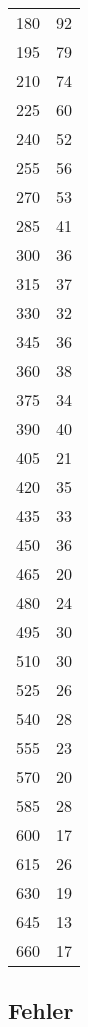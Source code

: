 \begin{table}
\begin{minipage}{.5\linewidth}
\begin{tabular}{c c}
            180	 &  92 \\
            195	 &  79 \\
            210	 &  74 \\
            225	 &  60 \\
            240	 &  52 \\
            255	 &  56 \\
            270	 &  53 \\
            285	 &  41 \\
            300	 &  36 \\
            315	 &  37 \\
            330	 &  32 \\
            345	 &  36 \\
            360	 &  38 \\
            375	 &  34 \\
            390	 &  40 \\
            405	 &  21 \\
            420	 &  35 \\
            435	 &  33 \\
            450	 &  36 \\
            465	 &  20 \\
            480	 &  24 \\
            495	 &  30 \\
            510	 &  30 \\
            525	 &  26 \\
            540	 &  28 \\
            555	 &  23 \\
            570	 &  20 \\
            585	 &  28 \\
            600	 &  17 \\
            615	 &  26 \\
            630	 &  19 \\
            645	 &  13 \\
            660	 &  17 \\
            \bottomrule
        \end{tabular}
    \end{minipage}
\end{table}
\newpage
\subsection{Fehler}

